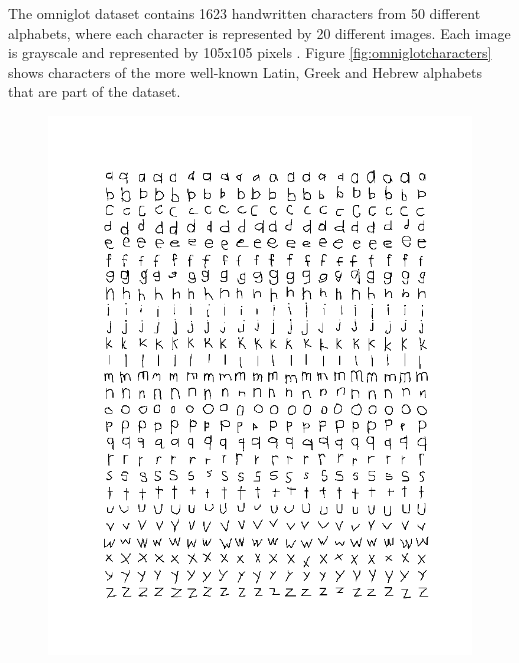 The omniglot dataset contains 1623 handwritten characters from 50 different alphabets, where each character is represented by 20 different images. Each image is grayscale and represented by 105x105 pixels \cite{Lake1332}. Figure \ref{fig:omniglotcharacters} shows characters of the more well-known Latin, Greek and Hebrew alphabets that are part of the dataset.

\begin{figure}[h]
\centering
\begin{minipage}{.3\textwidth}
  \centering
  \includegraphics[width=\linewidth]{images/latin}
\end{minipage}
\begin{minipage}{.3\textwidth}
  \centering

\end{minipage}
\end{figure}
